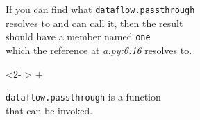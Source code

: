 \documentclass[aspectratio=169]{beamer}
\begin{document}
\begin{frame}[fragile]
\begin{center}
\begin{minipage}[c][2cm][c]{0.46\textwidth}
            \begin{center}
            \smaller[1]
            If you can find what \texttt{dataflow.passthrough} \\
            resolves to and can call it, then the result \\
            should have a member named \texttt{one} \\
            which the reference at \textit{a.py:6:16} resolves to. \\
            \end{center}
        \end{minipage}
        \begin{uncoverenv}<2- >
            \; $+$ \;
        \begin{minipage}[c][2cm][c]{0.46\textwidth}
            \begin{center}
            \smaller[1]
            \texttt{dataflow.passthrough} is a function \\
            that can be invoked. \\
            \end{center}
        \end{minipage}
        \end{uncoverenv}
    \end{center}
\end{frame}
\end{document}
